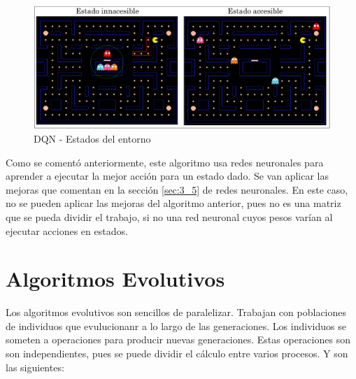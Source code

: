 		
		\begin{figure}[!h]
			\centering
			\includegraphics[width=1\textwidth]{images/chapter_3/pacman_states}	
			\caption{DQN - Estados del entorno}
			\label{fig:pacman_states}
		\end{figure}
		
			
		
		Como se comentó anteriormente, este algoritmo usa redes neuronales para aprender a ejecutar la mejor acción para un estado dado. Se van aplicar las mejoras que comentan en la sección \ref{sec:3_5} de redes neuronales. En este caso, no se pueden aplicar las mejoras del algoritmo anterior, pues no es una matriz que se pueda dividir el trabajo, si no una red neuronal cuyos pesos varían al ejecutar acciones en estados. 	
		
		
	
		
	
	\newpage
	


\section{Algoritmos Evolutivos}
	\label{cap:3_4}
	Los algoritmos evolutivos son sencillos de paralelizar. Trabajan con poblaciones de individuos que evulucionanr a lo largo de las generaciones. Los individuos se someten a operaciones para producir nuevas generaciones. Estas operaciones son son independientes, pues se puede dividir el cálculo entre varios procesos. Y son las siguientes: 
	
